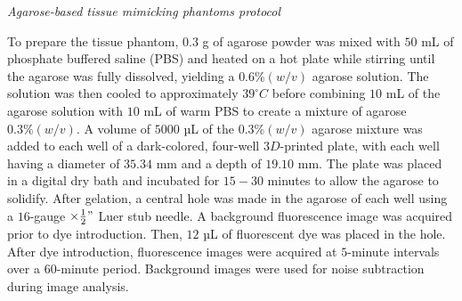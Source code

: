 \textit{Agarose-based tissue mimicking phantoms protocol}

To prepare the tissue phantom, $0.3$ g of agarose powder was mixed with $50$ mL of phosphate buffered saline (PBS) and heated on a hot plate while stirring until the agarose was fully dissolved, yielding a $0.6\% (w/v)$ agarose solution. The solution was then cooled to approximately $39^\circ C$ before combining $10$ mL of the agarose solution with $10$ mL of warm PBS to create a mixture of agarose $0.3\% (w/v)$. A volume of $5000$ µL of the $0.3\% (w/v)$ agarose mixture was added to each well of a dark-colored, four-well $3D$-printed plate, with each well having a diameter of $35.34$ mm and a 
depth of $19.10$ mm. The plate was placed in a digital dry bath and incubated for $15-30$ minutes to allow the agarose to solidify. After gelation, a central hole was made in the agarose of each well using a $16$-gauge $\times \frac{1}{2}"$ Luer stub needle. A background fluorescence image was acquired prior to dye introduction. Then, $12$ µL of fluorescent dye was placed in the hole. After dye introduction, fluorescence images were acquired at $5$-minute intervals over a $60$-minute period. 
Background images were used for noise subtraction during image analysis.